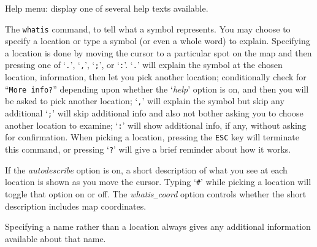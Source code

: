 \blist{}
\item[\tb{?}]
Help menu:  display one of several help texts available.
\item[\tb{/}]
The {\tt whatis} command, to
tell what a symbol represents.  You may choose to specify a location
or type a symbol (or even a whole word) to explain.
Specifying a location is done by moving the cursor to a particular spot
on the map and then pressing one of `{\tt .}', `{\tt ,}', `{\tt ;}',
or `{\tt :}'.  `{\tt .}' will explain the symbol at the chosen location,
information, then let you pick another location;
conditionally check for ``{\tt More info?}'' depending upon whether the
`{\it help\/}'
option is on, and then you will be asked to pick another location;
`{\tt ,}' will explain the symbol but skip any additional
`{\tt ;}' will skip additional info and also not bother asking
you to choose another location to examine; `{\tt :}' will show additional
info, if any, without asking for confirmation.  When picking a location,
pressing the {\tt ESC} key will terminate this command, or pressing `{\tt ?}'
will give a brief reminder about how it works.

If the
{\it autodescribe\/}
option is on, a short description of what you see at each location is
shown as you move the cursor.  Typing `{\tt \#}' while picking a location will
toggle that option on or off.
The
{\it whatis\verb+_+coord\/}
option controls whether the short description includes map coordinates.

Specifying a name rather than a location
always gives any additional information available about that name.

